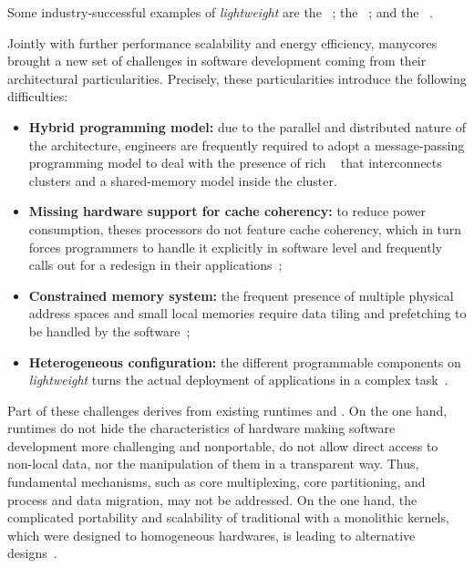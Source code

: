 	Some industry-successful examples of \textit{lightweight} \manycores are
	the \mppa~\cite{DeDinechin2013-1};
	the \epiphany~\cite{olofsson2014}; and
	the \taihulight~\cite{zheng2015}.

	Jointly with further performance scalability and energy efficiency, manycores brought a new
	set of challenges in software development coming from their architectural particularities.
	Precisely, these particularities introduce the following difficulties:
	\begin{itemize}
		\item \textbf{Hybrid programming model:} due to the parallel and distributed nature of
			the architecture, engineers are frequently required to adopt a message-passing
			programming model to deal with the presence of rich \nocs~\cite{kelly2013} that
			interconnects clusters and a shared-memory model inside the cluster.
		\item \textbf{Missing hardware support for cache coherency:} to reduce power consumption,
			theses processors do not feature cache coherency, which in turn forces programmers to
			handle it explicitly in software level and frequently calls out for a redesign in their
			applications~\cite{francesquini2015};
		\item \textbf{Constrained memory system:} the frequent presence of multiple physical
			address spaces and small local memories require data tiling and prefetching to be
			handled by the software~\cite{Castro2016};
		\item \textbf{Heterogeneous configuration:} the different programmable components on
			\textit{lightweight} \manycores turns the actual deployment of applications in a
			complex task~\cite{barbalace2015}.
	\end{itemize}

	Part of these challenges derives from existing runtimes and \oses.
	On the one hand, runtimes do not hide the characteristics of hardware making
	software development more challenging and nonportable, \eg do not allow
	direct access to non-local data, nor the manipulation of them in a transparent way.
	Thus, fundamental \os mechanisms, such as core multiplexing, core partitioning,
	and process and data migration, may not be addressed.
	On the one hand, the complicated portability and scalability of traditional \oses with a
	monolithic kernels, which were designed to homogeneous hardwares, is leading to alternative
	\os designs~\cite{Baumann2009, kluge2014, nightingale2009, rhoden2011}.

